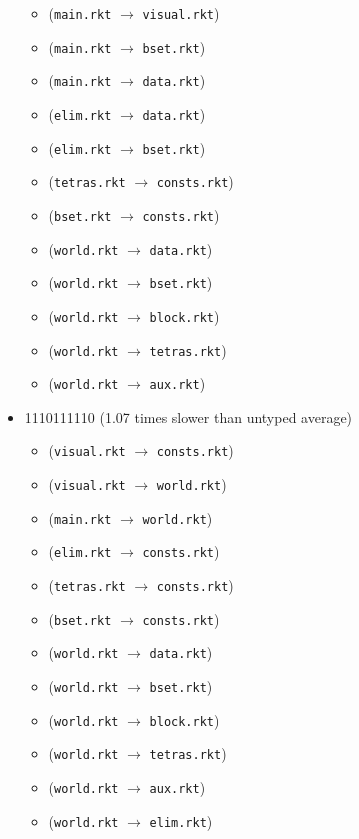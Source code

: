 \documentclass{article}
\newcommand{\mono}[1]{\texttt{#1}}
\begin{document}
\begin{itemize}
\begin{itemize}
  \item (\mono{main.rkt} $\rightarrow$ \mono{visual.rkt})
  \item (\mono{main.rkt} $\rightarrow$ \mono{bset.rkt})
  \item (\mono{main.rkt} $\rightarrow$ \mono{data.rkt})
  \item (\mono{elim.rkt} $\rightarrow$ \mono{data.rkt})
  \item (\mono{elim.rkt} $\rightarrow$ \mono{bset.rkt})
  \item (\mono{tetras.rkt} $\rightarrow$ \mono{consts.rkt})
  \item (\mono{bset.rkt} $\rightarrow$ \mono{consts.rkt})
  \item (\mono{world.rkt} $\rightarrow$ \mono{data.rkt})
  \item (\mono{world.rkt} $\rightarrow$ \mono{bset.rkt})
  \item (\mono{world.rkt} $\rightarrow$ \mono{block.rkt})
  \item (\mono{world.rkt} $\rightarrow$ \mono{tetras.rkt})
  \item (\mono{world.rkt} $\rightarrow$ \mono{aux.rkt})
  \end{itemize}
\item 1110111110 (1.07 times slower than untyped average)
  \begin{itemize}
  \item (\mono{visual.rkt} $\rightarrow$ \mono{consts.rkt})
  \item (\mono{visual.rkt} $\rightarrow$ \mono{world.rkt})
  \item (\mono{main.rkt} $\rightarrow$ \mono{world.rkt})
  \item (\mono{elim.rkt} $\rightarrow$ \mono{consts.rkt})
  \item (\mono{tetras.rkt} $\rightarrow$ \mono{consts.rkt})
  \item (\mono{bset.rkt} $\rightarrow$ \mono{consts.rkt})
  \item (\mono{world.rkt} $\rightarrow$ \mono{data.rkt})
  \item (\mono{world.rkt} $\rightarrow$ \mono{bset.rkt})
  \item (\mono{world.rkt} $\rightarrow$ \mono{block.rkt})
  \item (\mono{world.rkt} $\rightarrow$ \mono{tetras.rkt})
  \item (\mono{world.rkt} $\rightarrow$ \mono{aux.rkt})
  \item (\mono{world.rkt} $\rightarrow$ \mono{elim.rkt})
  \end{itemize}

\end{itemize}
\end{document}
